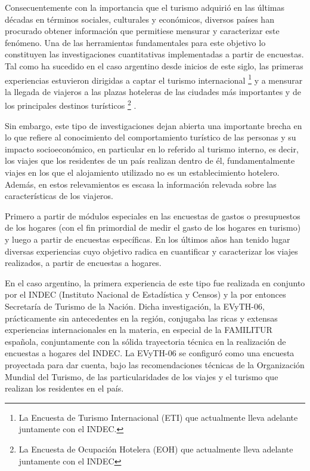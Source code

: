 \documentclass[
  openany]{book}
\begin{document}
Consecuentemente con la importancia que el turismo adquirió en las últimas décadas en términos sociales, culturales y económicos, diversos países han procurado obtener información que permitiese mensurar y caracterizar este fenómeno. Una de las herramientas fundamentales para este objetivo lo constituyen las investigaciones cuantitativas implementadas a partir de encuestas. Tal como ha sucedido en el caso argentino desde inicios de este siglo, las primeras experiencias estuvieron dirigidas a captar el turismo internacional \footnote{La Encuesta de Turismo Internacional (ETI) que actualmente lleva adelante juntamente con el INDEC.} y a mensurar la llegada de viajeros a las plazas hoteleras de las ciudades más importantes y de los principales destinos turísticos \footnote{La Encuesta de Ocupación Hotelera (EOH) que actualmente lleva adelante juntamente con el INDEC} .

Sin embargo, este tipo de investigaciones dejan abierta una importante brecha en lo que refiere al conocimiento del comportamiento turístico de las personas y su impacto socioeconómico, en particular en lo referido al turismo interno, es decir, los viajes que los residentes de un país realizan dentro de él, fundamentalmente viajes en los que el alojamiento utilizado no es un establecimiento hotelero. Además, en estos relevamientos es escasa la información relevada sobre las características de los viajeros.

Primero a partir de módulos especiales en las encuestas de gastos o presupuestos de los hogares (con el fin primordial de medir el gasto de los hogares en turismo) y luego a partir de encuestas específicas. En los últimos años han tenido lugar diversas experiencias cuyo objetivo radica en cuantificar y caracterizar los viajes realizados, a partir de encuestas a hogares.

En el caso argentino, la primera experiencia de este tipo fue realizada en conjunto por el INDEC (Instituto Nacional de Estadística y Censos) y la por entonces Secretaría de Turismo de la Nación. Dicha investigación, la EVyTH-06, prácticamente sin antecedentes en la región, conjugaba las ricas y extensas experiencias internacionales en la materia, en especial de la FAMILITUR española, conjuntamente con la sólida trayectoria técnica en la realización de encuestas a hogares del INDEC. La EVyTH-06 se configuró como una encuesta proyectada para dar cuenta, bajo las recomendaciones técnicas de la Organización Mundial del Turismo, de las particularidades de los viajes y el turismo que realizan los residentes en el país.
\end{document}
